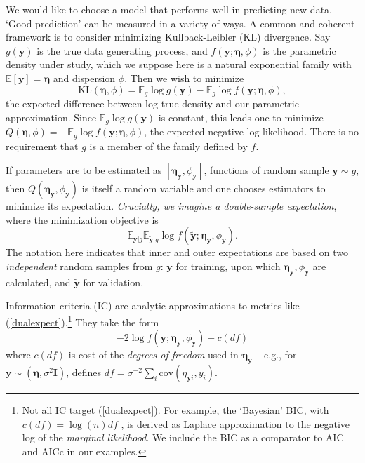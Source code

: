 \documentclass[12pt]{article}
\newcommand{\bs}[1]{\boldsymbol{#1}}
\newcommand{\mr}[1]{\mathrm{#1}}
\newcommand{\bm}[1]{\mathbf{#1}}
\newcommand{\ds}[1]{\mathds{#1}}
\begin{document}
We would like to choose a model that performs well in predicting new data.
 `Good prediction' can be measured in a variety of ways.  A common and
 coherent framework is to consider minimizing Kullback-Leibler (KL)
 divergence.  Say $g(\bm{y})$ is the true data generating process, and
 $f(\bm{y}; \bs{\eta},\phi)$ is the parametric density under study, which we
 suppose here is a natural exponential family  with $\ds{E}[\bm{y}]=\bs{\eta}$
 and dispersion $\phi$. Then we wish to minimize
\begin{equation}
\mr{KL}(\bs{\eta},\phi) = \ds{E}_g \log g(\bm{y}) - \ds{E}_g \log f(\bm{y}; \bs{\eta},\phi),
\end{equation}
the expected difference between log true density and our parametric approximation.  Since $\ds{E}_g \log g(\bm{y})$ is constant, this leads one to minimize 
$Q(\bs{\eta},\phi) = -\ds{E}_g \log f(\bm{y}; \bs{\eta},\phi)$, the expected negative log likelihood.   There is no requirement that $g$ is a member of the family defined by $f$.

If parameters are to be estimated as $[\bs{\eta}_{\bm{y}},\phi_{\bm{y}}]$, functions of random sample $\bm{y} \sim g$, then $Q(\bs{\eta}_{\bm{y}},\phi_{\bm{y}})$ is itself a random variable and one chooses estimators to minimize its expectation.  {\it Crucially, we imagine a double-sample expectation}, where the minimization objective is
\begin{equation}\label{dualexpect}
\ds{E}_{\bm{y}|g} \ds{E}_{\bm{\tilde y}|g} \log f(\bm{\tilde y}; \bs{\eta}_{\bm{y}},\phi_{\bm{y}}).
\end{equation}
The notation here indicates that inner and outer expectations are based on two {\it independent} random samples from $g$: $\bm{y}$ for training, upon which $\bs{\eta}_{\bm{y}},\phi_{\bm{y}}$ are calculated, and $\bm{\tilde y}$ for validation.  

Information criteria (IC) are analytic approximations to metrics like
(\ref{dualexpect}).\footnote{Not all IC target (\ref{dualexpect}).  For
example, the `Bayesian' BIC, with  $c(df) =\log(n)df$
\citep{schwarz_estimating_1978}, is derived
\citep{kass_bayes_1995} as Laplace approximation to the negative log of the
 {\it marginal likelihood}.  We include the BIC as a comparator to AIC and
 AICc in our examples. }  They take the form
\begin{equation}\label{ic}
 -2\log f(\bm{y}; \bs{\eta}_{\bm{y}},\phi_{\bm{y}}) + c(df)
 \end{equation} 
where $c(df)$ is cost of the {\it degrees-of-freedom} used in
$\bs{\eta}_{\bm{y}}$ -- e.g., for $\bm{y} \sim (\bs{\eta},\sigma^2\bm{I})$,
\citet{efron_least_2004} defines $df =
\sigma^{-2} \sum_i \mr{cov}(\eta_{\bm{y}i}, y_i)$. 
\end{document}
